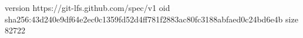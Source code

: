 version https://git-lfs.github.com/spec/v1
oid sha256:43d240e9df64e2ec0c1359fd52d4ff781f2883ac80fc3188abfaed0c24bd6e4b
size 82722
